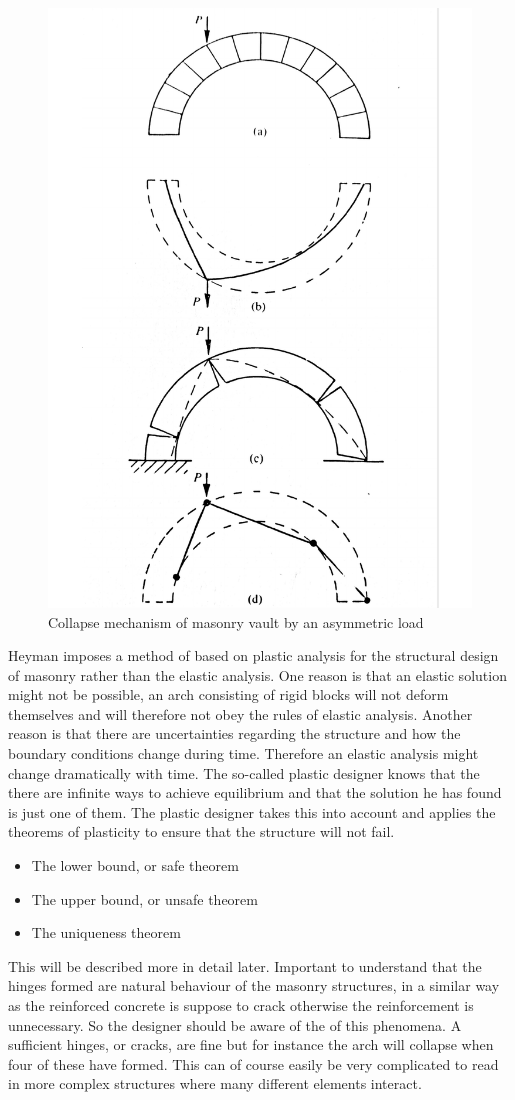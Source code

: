 \begin{figure}[H] 
\centering
\includegraphics[width=0.5\linewidth ]{figure/Theory/heyman3.pdf}
\caption{Collapse mechanism of masonry vault by an asymmetric load}
\label{fig:arch2}
\end{figure}

Heyman imposes a method of based on plastic analysis for the structural design of masonry rather than the elastic analysis. One reason is that an elastic solution might not be possible, an arch consisting of rigid blocks will not deform themselves and will therefore not obey the rules of elastic analysis. Another reason is that there are uncertainties regarding the structure and how the boundary conditions change during time. Therefore an elastic analysis might change dramatically with time. The so-called plastic designer knows that the there are infinite ways to achieve equilibrium and that the solution he has found is just one of them. The plastic designer takes this into account and applies the theorems of plasticity to ensure that the structure will not fail. \\


\begin{itemize}
\item The lower bound, or safe theorem
\item The upper bound, or unsafe theorem
\item The uniqueness theorem
\end{itemize}

This will be described more in detail later. Important to understand that the hinges formed are natural behaviour of the masonry structures, in a similar way as the reinforced concrete is suppose to crack otherwise the reinforcement is unnecessary. So the designer should be aware of the of this phenomena. A sufficient hinges, or cracks, are fine but for instance the arch will collapse when four of these have formed. This can of course easily be very complicated to read in more complex structures where many different elements interact.

